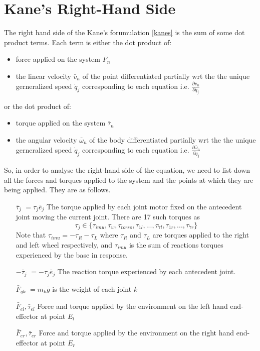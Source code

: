 \documentclass[a4paper,10pt]{article}
\begin{document}
\section{Kane's Right-Hand Side}
The right hand side of the Kane's forumulation \ref{kanes} is the sum of some dot product terms. Each term is either the
dot product of:
\begin{itemize}
 \item force applied on the system $\bar{F}_n$
 \item the linear velocity $\bar{v}_n$ of the point differentiated partially wrt the the unique gerneralized speed 
 $\dot{q}_j$ corresponding to each equation i.e. $\frac{\partial \bar{v}_n}{\partial \dot{q}_j}$\\
\end{itemize}
or the dot product of:
\begin{itemize}
 \item torque applied on the system $\bar{\tau}_n$
 \item the angular velocity $\bar{\omega}_n$ of the body differentiated partially wrt the the unique gerneralized speed 
 $\dot{q}_j$ corresponding to each equation i.e. $\frac{\partial \bar{\omega}_n}{\partial \dot{q}_j}$
\end{itemize}

So, in order to analyse the right-hand side of the equation, we need to list down all the forces and torques applied
to the system and the points at which they are being applied. They are as follows. 
\begin{itemize}[label={}]
 \item[$\bar\tau_j$] $=\tau_j\bar{e}_j$ The torque applied by each joint motor fixed on the antecedent joint moving the current joint. There
 are 17 such torques as \[ \tau_j \in \{ \tau_{imu}, \tau_{w}, \tau_{torso}, \tau_{1l}, ... , \tau_{7l}, \tau_{1r}, ... , \tau_{7r} \} \]
 Note that $\tau_{imu} = -\tau_R-\tau_L$ where $\tau_R$ and $\tau_L$ are torques applied to the right and left wheel respectively,
 and $\tau_{imu}$ is the sum of reactions torques experienced by the base in response.
 \item[$-\bar\tau_j$] $=-\tau_j\bar{e}_j$ The reaction torque experienced by each antecedent joint.
 \item[$\bar{F}_{gk}$] $=m_k\bar{g}$ is the weight of each joint $k$
 \item[$\bar{F}_{el}, \bar{\tau}_{el}$] Force and torque applied by the environment on the left hand end-effector at point $E_l$
 \item[$\bar{F}_{er}, \bar{\tau}_{er}$] Force and torque applied by the environment on the right hand end-effector at point $E_r$
\end{itemize}
\end{document}
